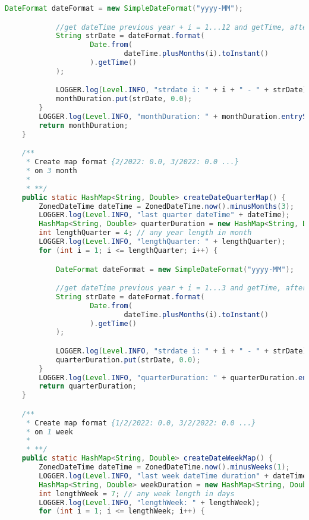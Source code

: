 \begin{lstlisting}[language=Java]
            DateFormat dateFormat = new SimpleDateFormat("yyyy-MM");

            //get dateTime previous year + i = 1...12 and getTime, after in strDate=2022-03
            String strDate = dateFormat.format(
                    Date.from(
                            dateTime.plusMonths(i).toInstant()
                    ).getTime()
            );

            LOGGER.log(Level.INFO, "strdate i: " + i + " - " + strDate);
            monthDuration.put(strDate, 0.0);
        }
        LOGGER.log(Level.INFO, "monthDuration: " + monthDuration.entrySet());
        return monthDuration;
    }

    /**
     * Create map format {2/2022: 0.0, 3/2022: 0.0 ...}
     * on 3 month
     *
     * **/
    public static HashMap<String, Double> createDateQuarterMap() {
        ZonedDateTime dateTime = ZonedDateTime.now().minusMonths(3);
        LOGGER.log(Level.INFO, "last quarter dateTime" + dateTime);
        HashMap<String, Double> quarterDuration = new HashMap<String, Double>();
        int lengthQuarter = 4; // any year length in month
        LOGGER.log(Level.INFO, "lengthQuarter: " + lengthQuarter);
        for (int i = 1; i <= lengthQuarter; i++) {

            DateFormat dateFormat = new SimpleDateFormat("yyyy-MM");

            //get dateTime previous year + i = 1...3 and getTime, after in strDate=2022-03
            String strDate = dateFormat.format(
                    Date.from(
                            dateTime.plusMonths(i).toInstant()
                    ).getTime()
            );

            LOGGER.log(Level.INFO, "strdate i: " + i + " - " + strDate);
            quarterDuration.put(strDate, 0.0);
        }
        LOGGER.log(Level.INFO, "quarterDuration: " + quarterDuration.entrySet());
        return quarterDuration;
    }

    /**
     * Create map format {1/2/2022: 0.0, 3/2/2022: 0.0 ...}
     * on 1 week
     *
     * **/
    public static HashMap<String, Double> createDateWeekMap() {
        ZonedDateTime dateTime = ZonedDateTime.now().minusWeeks(1);
        LOGGER.log(Level.INFO, "last week dateTime duration" + dateTime);
        HashMap<String, Double> weekDuration = new HashMap<String, Double>();
        int lengthWeek = 7; // any week length in days
        LOGGER.log(Level.INFO, "lengthWeek: " + lengthWeek);
        for (int i = 1; i <= lengthWeek; i++) {


\end{lstlisting}
